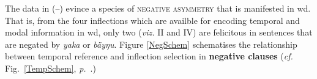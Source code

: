 %	
%	

The data in (--) evince a species of \textsc{negative asymmetry} that is manifested in \gls{wd}. That is, from the four inflections which are availble for encoding temporal and modal information in \gls{wd}, only two (\textit{viz.} \gls{II} and \gls{IV}) are felicitous in sentences that are negated by \textit{yaka} or \textit{bäyŋu}. Figure \ref{NegSchem} schematises the relationship between temporal reference and inflection selection in \textbf{negative clauses} (\textit{cf.} Fig.~\ref{TempSchem}, \textit{p.}~\pageref{TempSchem}.)


